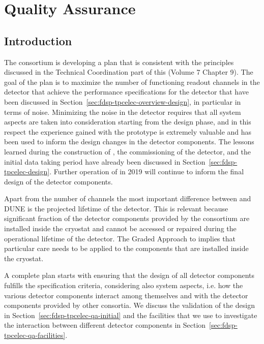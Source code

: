 \section{Quality Assurance}
\label{sec:fdsp-tpcelec-qa}

\subsection{Introduction}
\label{sec:fdsp-tpcelec-qa-introduction}

The  consortium is developing a  plan that is consistent
with the principles discussed in the Technical Coordination part of this 
 (Volume 7 Chapter 9). %
The goal of the  plan is to maximize the number of functioning
readout channels in the detector that achieve the performance specifications
for the detector that have been discussed in Section~\ref{sec:fdsp-tpcelec-overview-design},
in particular in terms of noise. Minimizing the noise in the detector requires that all
system aspects are taken into consideration starting from the design phase, and in this
respect the experience gained with the  prototype is extremely
valuable and has been used to inform the design changes in the detector 
components. The lessons learned during the construction of ,
the commissioning of the detector, and the initial data taking period have
already been discussed in Section~\ref{sec:fdsp-tpcelec-design}. Further
operation of  in 2019 will continue to inform the final design
of the detector components.

Apart from the number of channels the most important difference
between  and DUNE is the projected lifetime of the detector. This
is relevant because significant fraction of the detector components provided 
by the  consortium are installed inside the cryostat and cannot 
be accessed or repaired during the operational lifetime of the detector. The 
Graded Approach to  implies that particular care needs to be applied
to the  components that are installed inside the cryostat.

A complete  plan starts with ensuring that the design of all
detector components fulfills the specification criteria, considering
also system aspects, i.e. how the various detector components interact
among themselves and with the detector components provided by other 
consortia. We discuss the validation of the design in 
Section~\ref{sec:fdsp-tpcelec-qa-initial} and the facilities that we use
to investigate the interaction between different detector components
in Section~\ref{sec:fdsp-tpcelec-qa-facilities}. 

